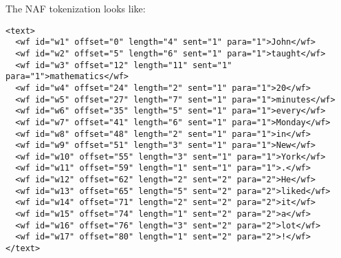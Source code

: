 The NAF tokenization looks like:
\begin{Verbatim}[fontsize=\small]
<text>
  <wf id="w1" offset="0" length="4" sent="1" para="1">John</wf>
  <wf id="w2" offset="5" length="6" sent="1" para="1">taught</wf>
  <wf id="w3" offset="12" length="11" sent="1" para="1">mathematics</wf>
  <wf id="w4" offset="24" length="2" sent="1" para="1">20</wf>
  <wf id="w5" offset="27" length="7" sent="1" para="1">minutes</wf>
  <wf id="w6" offset="35" length="5" sent="1" para="1">every</wf>
  <wf id="w7" offset="41" length="6" sent="1" para="1">Monday</wf>
  <wf id="w8" offset="48" length="2" sent="1" para="1">in</wf>
  <wf id="w9" offset="51" length="3" sent="1" para="1">New</wf>
  <wf id="w10" offset="55" length="3" sent="1" para="1">York</wf>
  <wf id="w11" offset="59" length="1" sent="1" para="1">.</wf>
  <wf id="w12" offset="62" length="2" sent="2" para="2">He</wf>
  <wf id="w13" offset="65" length="5" sent="2" para="2">liked</wf>
  <wf id="w14" offset="71" length="2" sent="2" para="2">it</wf>
  <wf id="w15" offset="74" length="1" sent="2" para="2">a</wf>
  <wf id="w16" offset="76" length="3" sent="2" para="2">lot</wf>
  <wf id="w17" offset="80" length="1" sent="2" para="2">!</wf>
</text>
\end{Verbatim}


